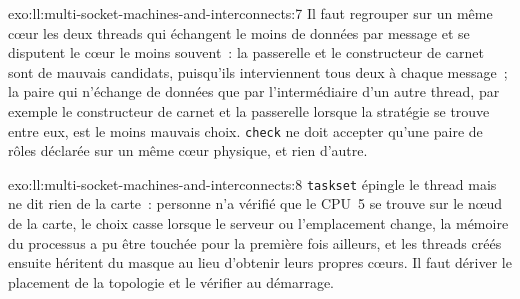 \begin{solution}{exo:ll:multi-socket-machines-and-interconnects:7}
Il faut regrouper sur un même cœur les deux threads qui échangent le moins de données par message et se disputent le
cœur le moins souvent~: la passerelle et le constructeur de carnet sont de mauvais candidats, puisqu'ils interviennent tous deux à chaque message~; la
paire qui n'échange de données que par l'intermédiaire d'un autre thread, par exemple le constructeur de carnet et la passerelle lorsque la stratégie se trouve entre eux, est le moins mauvais choix.
\texttt{check} ne doit accepter qu'une paire de rôles déclarée sur un même cœur physique, et rien d'autre.
\end{solution}

\begin{solution}{exo:ll:multi-socket-machines-and-interconnects:8}
\texttt{taskset} épingle le thread mais ne dit rien de la carte~: personne n'a vérifié que le CPU~5 se trouve sur le nœud
de la carte, le choix casse lorsque le serveur ou l'emplacement change, la mémoire du processus a pu être touchée pour la
première fois ailleurs, et les threads créés ensuite héritent du masque au lieu d'obtenir leurs propres cœurs. Il faut dériver le
placement de la topologie et le vérifier au démarrage.
\end{solution}

